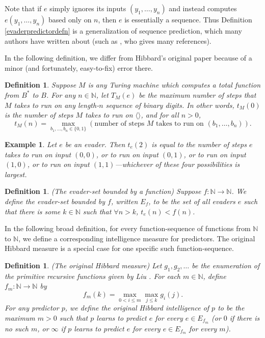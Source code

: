 \documentclass{article}
\newtheorem{definition}[theorem]{Definition}
\newtheorem{example}[theorem]{Example}
\begin{document}
Note that if $e$ simply ignores its inputs $(y_1,\ldots,y_n)$ and instead
computes $e(y_1,\ldots,y_n)$ based only on $n$, then $e$ is essentially a sequence.
Thus Definition \ref{evaderpredictordefn} is a generalization of sequence prediction,
which many authors have written about (such as \cite{legg2006there}, who gives many
references).

In the following definition, we differ from Hibbard's original paper
because of a minor (and fortunately, easy-to-fix) error there.

\begin{definition}
\label{tsubedefinition}
    Suppose $M$ is any Turing machine which computes a total function from $B^*$ to $B$.
    For any $n\in\mathbb N$, let $T_M(e)$ be the maximum number of steps that $M$ takes
    to run on any length-$n$ sequence of binary digits.
    In other words, $t_M(0)$ is the number of steps $M$ takes to run on $\langle\rangle$,
    and for all $n>0$,
    \[
        t_M(n) = \max_{b_1,\ldots,b_n\in \{0,1\}}
        (\text{number of steps $M$ takes to run on $(b_1,\ldots,b_n)$}).
    \]
\end{definition}

\begin{example}
    Let $e$ be an evader. Then
    $t_e(2)$ is equal to the number of steps $e$ takes to run on input
    $(0,0)$, or to run on input $(0,1)$, or to run on input $(1,0)$, or to run on input
    $(1,1)$---whichever of these four possibilities is largest.
\end{example}

\begin{definition}
\label{evadersetdefinition}
    (The evader-set bounded by a function)
    Suppose $f:\mathbb N\to\mathbb N$. We define the \emph{evader-set bounded by $f$},
    written $E_f$, to be the set of all evaders $e$ such that
    there is some $k\in\mathbb N$ such that $\forall n>k$,
    $t_e(n)<f(n)$.
\end{definition}

In the following broad definition, for every function-sequence of functions
from $\mathbb N$ to $\mathbb N$, we define a corresponding intelligence measure
for predictors.
The original Hibbard measure is a special case for one specific
such function-sequence.

\begin{definition}
\label{classichibbardmeasuredefn}
    (The original Hibbard measure)
    Let $g_1,g_2,\ldots$ be the enumeration of the primitive recursive
    functions given by Liu \cite{liu1960enumeration}.
    For each $m\in\mathbb N$, define $f_m:\mathbb N\to\mathbb N$ by
    \[f_m(k)=\max_{0<i\leq m}\max_{j\leq k}g_i(j).\]
    For any predictor $p$, we define the \emph{original Hibbard intelligence of $p$}
    to be the maximum $m>0$
    such that $p$ learns to predict $e$ for every $e\in E_{f_m}$
    (or $0$ if there is no such $m$, or $\infty$ if $p$ learns to predict $e$
    for every $e\in E_{f_m}$ for every $m$).
\end{definition}
\end{document}
